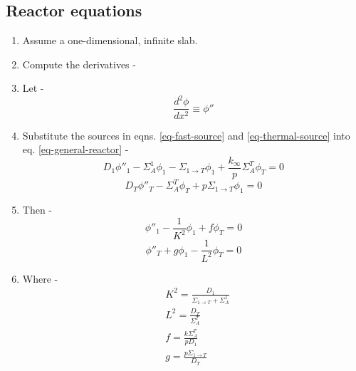 \documentclass[11pt,a4paper]{article}
\begin{document}
\subsection{Reactor equations}
\begin{enumerate}[leftmargin=*,topsep=0pt]
    \item Assume a one-dimensional, infinite slab.
    \item Compute the derivatives - 
    \item[] Let - 
        \begin{equation*}
            \frac{d^2\phi}{dx^2} \equiv \phi''
        \end{equation*}
    \item Substitute the sources in eqns. \ref{eq-fast-source} and \ref{eq-thermal-source} into eq. \ref{eq-general-reactor} - 
        \begin{equation} 
            D_1\phi''_1-\Sigma_A^1\phi_1-\Sigma_{1 \rightarrow T}\phi_1+\frac{k_{\infty}}{p} \Sigma_A^T \phi_T=0
        \end{equation}
        \begin{equation} 
            D_T\phi''_T-\Sigma_A^T\phi_T+p\Sigma_{1 \rightarrow T}\phi_1=0
        \end{equation}
    \item Then - 
        \begin{equation} \label{eq-fast-flux}
            \phi''_1-\frac{1}{K^2}\phi_1+f\phi_T=0
        \end{equation}
        \begin{equation} \label{eq-thermal-flux}
            \phi''_T+g\phi_1-\frac{1}{L^2}\phi_T=0
        \end{equation}
    \item[] Where - 
        \begin{equation*}
            \begin{split}
                & K^2=\frac{D_1}{\Sigma_{1 \rightarrow T}+\Sigma_A^1} \\
                & L^2=\frac{D_T}{\Sigma_A^T} \\
                & f=\frac{k\Sigma_A^T}{pD_1} \\
                & g=\frac{p\Sigma_{1 \rightarrow T}}{D_T}
            \end{split}
        \end{equation*}
\end{enumerate}
\end{document}
